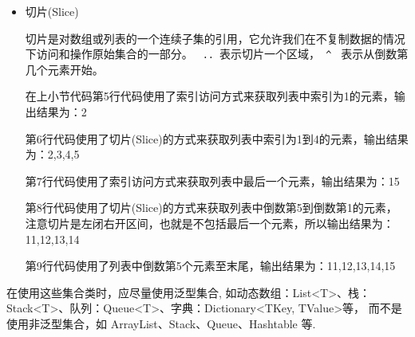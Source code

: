 \begin{itemize}
          上述代码第1行，定义了 一个 List<int> 类型的动态数组 numbers，这是采用了表达式初始化器的方式进行了定义，
          还可以用如下之一的定义方式：

          \begin{lstlisting}
List<int> numbers1 = new List<int>(){1,2,3,4,5,6,7,8,10,11,12,13,14,15};
List<int> numbers2 = new(){1,2,3,4,5,6,7,8,10,11,12,13,14,15};
var numbers3 = new List<int>(){1,2,3,4,5,6,7,8,10,11,12,13,14,15};
\end{lstlisting}

          第2行代码使用了 Lambda 表达式的方式来遍历列表中的每个元素，并将其打印出来。输出结果为：
          \verb|1, 2, 3, 4, 5, 6, 7, 8, 10, 11, 12, 13, 14, 15, |

          传统的遍历输出方式为：
          \begin{lstlisting}
foreach (int number in numbers)
{
    Console.Write(number + ", ");
}
\end{lstlisting}

          List<T> 几乎是 \cs 中最常用的集合类(动态数组)，List<T> 是一个泛型集合类，T 表示集合中元素的类型。


    \item  切片(Slice)

          切片是对数组或列表的一个连续子集的引用，它允许我们在不复制数据的情况下访问和操作原始集合的一部分。
          \verb| .. |表示切片一个区域，\verb| ^ | 表示从倒数第几个元素开始。

          在上小节代码第5行代码使用了索引访问方式来获取列表中索引为1的元素，输出结果为：2

          第6行代码使用了切片(Slice)的方式来获取列表中索引为1到4的元素，输出结果为：2,3,4,5

          第7行代码使用了索引访问方式来获取列表中最后一个元素，输出结果为：15

          第8行代码使用了切片(Slice)的方式来获取列表中倒数第5到倒数第1的元素，
          注意切片是左闭右开区间，也就是不包括最后一个元素，所以输出结果为：11,12,13,14

          第9行代码使用了列表中倒数第5个元素至末尾，输出结果为：11,12,13,14,15

\end{itemize}


在使用这些集合类时，应尽量使用泛型集合, 如动态数组：List<T>、栈：Stack<T>、队列：Queue<T>、字典：Dictionary<TKey, TValue>等，
而不是使用非泛型集合，如 ArrayList、Stack、Queue、Hashtable 等.



